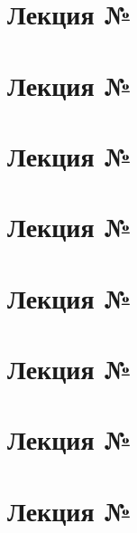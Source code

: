 
% 




\section{Лекция № \thesection}


\section{Лекция № \thesection}


\section{Лекция № \thesection}


\section{Лекция № \thesection}


\section{Лекция № \thesection}


\setcounter{section}{7}
\section{Лекция № \thesection}


\setcounter{section}{9}
\section{Лекция № \thesection } %


% 


\setcounter{section}{11}
\section{Лекция № \thesection}
